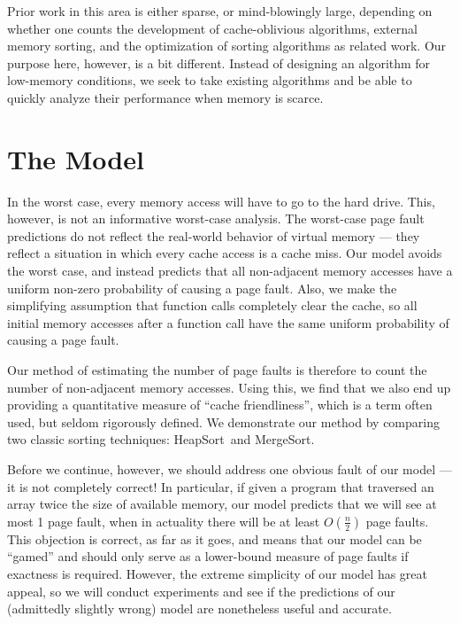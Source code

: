 \documentclass[11pt]{article}
\newcommand{\heapsort}{{\sc HeapSort}}
\newcommand{\mergesort}{{\sc MergeSort}}
\begin{document}
Prior work in this area is either sparse, or mind-blowingly large, depending on
whether one counts the development of cache-oblivious algorithms\cite{cacheo},
external memory sorting, and the optimization of sorting
algorithms\cite{314324,radix} as related work.  Our purpose here, however, is a
bit different.  Instead of designing an algorithm for low-memory conditions, we
seek to take existing algorithms and be able to quickly analyze their
performance when memory is scarce.


\section{The Model}
\label{model}

In the worst case, every memory access will have to go to the hard drive.
This, however, is not an informative worst-case analysis.  The worst-case page
fault predictions do not reflect the real-world behavior of virtual memory ---
they reflect a situation in which every cache access is a cache miss. Our model
avoids the worst case, and instead predicts that all non-adjacent memory
accesses have a uniform non-zero probability of causing a page fault.  Also, we
make the simplifying assumption that function calls completely clear the cache,
so all initial memory accesses after a function call have the same uniform
probability of causing a page fault.

Our method of estimating the number of page faults is therefore to count the
number of non-adjacent memory accesses.  Using this, we find that we also end
up providing a quantitative measure of ``cache friendliness'', which is a term
often used, but seldom rigorously defined.  We demonstrate our method by
comparing two classic sorting techniques: \heapsort\ and \mergesort.

Before we continue, however, we should address one obvious fault of our
model --- it is not completely correct!  In particular, if given a program that
traversed an array twice the size of available memory, our model predicts that
we will see at most 1 page fault, when in actuality there will be at least
$O(\frac{n}{2})$ page faults.  This objection is correct, as far as it goes,
and means that our model can be ``gamed'' and should only serve as a
lower-bound measure of page faults if exactness is required.  However, the
extreme simplicity of our model has great appeal, so we will conduct
experiments and see if the predictions of our (admittedly slightly wrong) model
are nonetheless useful and accurate.
\end{document}
